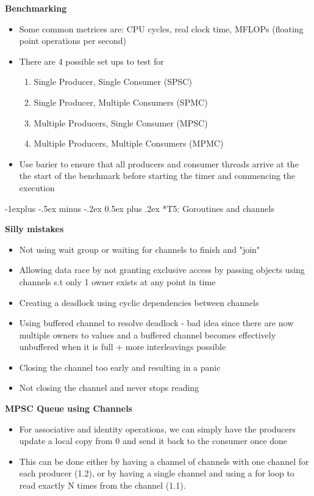 \documentclass[10pt, landscape]{article}
\makeatletter
\renewcommand{\subsection}{\@startsection{subsection}{2}{0mm}%
                                {-1explus -.5ex minus -.2ex}%
                                {0.5ex plus .2ex}%
                                {\normalfont\normalsize\bfseries}}
\makeatother
\begin{document}
\begin{multicols}{4}
\textbf{Benchmarking} \\
\begin{itemize}
    \item Some common metrices are: CPU cycles, real clock time, MFLOPs (floating point operations per second) 
    \item There are 4 possible set ups to test for 
    \begin{enumerate}
        \item Single Producer, Single Consumer (SPSC)
        \item Single Producer, Multiple Consumers (SPMC)
        \item Multiple Producers, Single Consumer (MPSC)
        \item Multiple Producers, Multiple Consumers (MPMC)
    \end{enumerate}
    \item Use barier to ensure that all producers and consumer threads arrive at the the start of the benchmark before starting the timer and commencing the execution
\end{itemize}

\subsection*{T5: Goroutines and channels}

\textbf{Silly mistakes} \\
\begin{itemize}
    \item Not using wait group or waiting for channels to finish and "join"
    \item Allowing data race by not granting exclusive access by passing objects using channels s.t only 1 owner exists at any point in time
    \item Creating a deadlock using cyclic dependencies between channels
    \item Using buffered channel to resolve deadlock - bad idea since there are now multiple owners to values and a buffered channel becomes effectively unbuffered when it is full + more interleavings possible
    \item Closing the channel too early and resulting in a panic
    \item Not closing the channel and never stops reading 
\end{itemize}

\textbf{MPSC Queue using Channels} \\
\begin{itemize}
    \item For associative and identity operations, we can simply have the producers update a local copy from 0 and send it back to the consumer once done 
    \item This can be done either by having a channel of channels with one channel for each producer (1.2), or by having a single channel and using a for loop to read exactly N times from the channel (1.1).
\end{itemize}


\end{multicols}
\end{document}
